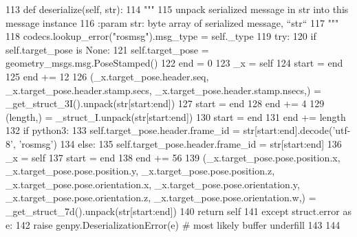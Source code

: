 \begin{DoxyCode}
113   \textcolor{keyword}{def }deserialize(self, str):
114     \textcolor{stringliteral}{"""}
115 \textcolor{stringliteral}{    unpack serialized message in str into this message instance}
116 \textcolor{stringliteral}{    :param str: byte array of serialized message, ``str``}
117 \textcolor{stringliteral}{    """}
118     codecs.lookup\_error(\textcolor{stringliteral}{"rosmsg"}).msg\_type = self.\_type
119     \textcolor{keywordflow}{try}:
120       \textcolor{keywordflow}{if} self.target\_pose \textcolor{keywordflow}{is} \textcolor{keywordtype}{None}:
121         self.target\_pose = geometry\_msgs.msg.PoseStamped()
122       end = 0
123       \_x = self
124       start = end
125       end += 12
126       (\_x.target\_pose.header.seq, \_x.target\_pose.header.stamp.secs, \_x.target\_pose.header.stamp.nsecs,) = 
      \_get\_struct\_3I().unpack(str[start:end])
127       start = end
128       end += 4
129       (length,) = \_struct\_I.unpack(str[start:end])
130       start = end
131       end += length
132       \textcolor{keywordflow}{if} python3:
133         self.target\_pose.header.frame\_id = str[start:end].decode(\textcolor{stringliteral}{'utf-8'}, \textcolor{stringliteral}{'rosmsg'})
134       \textcolor{keywordflow}{else}:
135         self.target\_pose.header.frame\_id = str[start:end]
136       \_x = self
137       start = end
138       end += 56
139       (\_x.target\_pose.pose.position.x, \_x.target\_pose.pose.position.y, \_x.target\_pose.pose.position.z, 
      \_x.target\_pose.pose.orientation.x, \_x.target\_pose.pose.orientation.y, \_x.target\_pose.pose.orientation.z, 
      \_x.target\_pose.pose.orientation.w,) = \_get\_struct\_7d().unpack(str[start:end])
140       \textcolor{keywordflow}{return} self
141     \textcolor{keywordflow}{except} struct.error \textcolor{keyword}{as} e:
142       \textcolor{keywordflow}{raise} genpy.DeserializationError(e)  \textcolor{comment}{# most likely buffer underfill}
143 
144 
\end{DoxyCode}
\mbox{\label{classmotion__plan_1_1msg_1_1__PlanningGoal_1_1PlanningGoal_a84aa86fc947477bc2aa11ac8e8fcaa2b}} 
